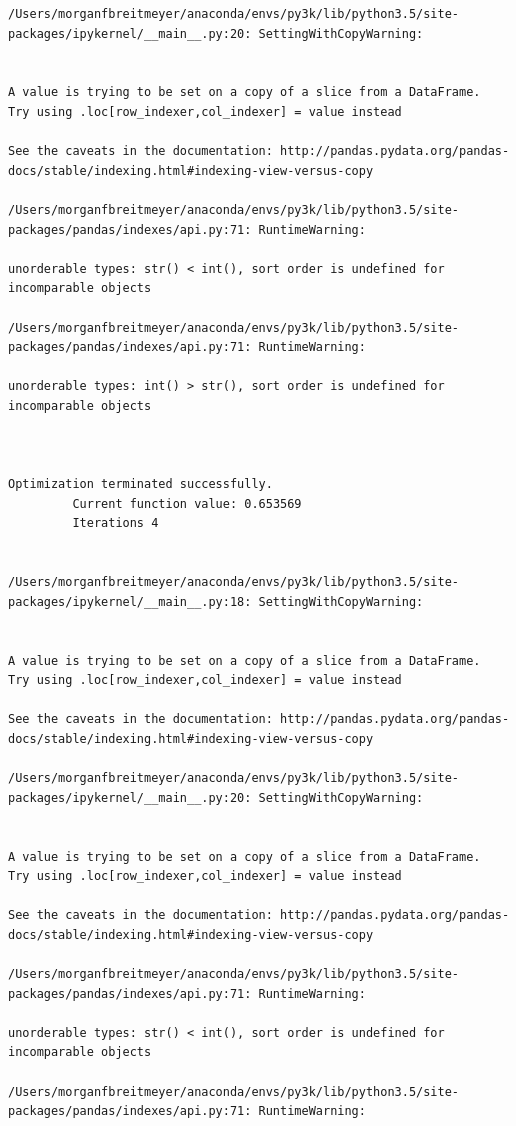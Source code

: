 \begin{lstlisting}
/Users/morganfbreitmeyer/anaconda/envs/py3k/lib/python3.5/site-packages/ipykernel/__main__.py:20: SettingWithCopyWarning:


A value is trying to be set on a copy of a slice from a DataFrame.
Try using .loc[row_indexer,col_indexer] = value instead

See the caveats in the documentation: http://pandas.pydata.org/pandas-docs/stable/indexing.html#indexing-view-versus-copy

/Users/morganfbreitmeyer/anaconda/envs/py3k/lib/python3.5/site-packages/pandas/indexes/api.py:71: RuntimeWarning:

unorderable types: str() < int(), sort order is undefined for incomparable objects

/Users/morganfbreitmeyer/anaconda/envs/py3k/lib/python3.5/site-packages/pandas/indexes/api.py:71: RuntimeWarning:

unorderable types: int() > str(), sort order is undefined for incomparable objects



Optimization terminated successfully.
         Current function value: 0.653569
         Iterations 4


/Users/morganfbreitmeyer/anaconda/envs/py3k/lib/python3.5/site-packages/ipykernel/__main__.py:18: SettingWithCopyWarning:


A value is trying to be set on a copy of a slice from a DataFrame.
Try using .loc[row_indexer,col_indexer] = value instead

See the caveats in the documentation: http://pandas.pydata.org/pandas-docs/stable/indexing.html#indexing-view-versus-copy

/Users/morganfbreitmeyer/anaconda/envs/py3k/lib/python3.5/site-packages/ipykernel/__main__.py:20: SettingWithCopyWarning:


A value is trying to be set on a copy of a slice from a DataFrame.
Try using .loc[row_indexer,col_indexer] = value instead

See the caveats in the documentation: http://pandas.pydata.org/pandas-docs/stable/indexing.html#indexing-view-versus-copy

/Users/morganfbreitmeyer/anaconda/envs/py3k/lib/python3.5/site-packages/pandas/indexes/api.py:71: RuntimeWarning:

unorderable types: str() < int(), sort order is undefined for incomparable objects

/Users/morganfbreitmeyer/anaconda/envs/py3k/lib/python3.5/site-packages/pandas/indexes/api.py:71: RuntimeWarning:


\end{lstlisting}
